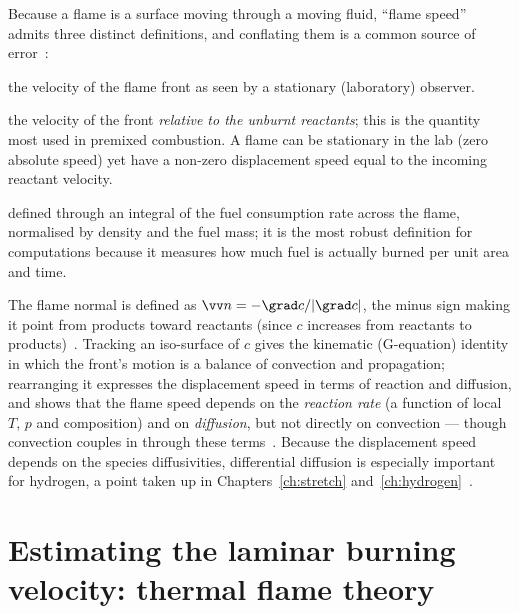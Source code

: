 Because a flame is a surface moving through a moving fluid, ``flame speed'' admits three distinct definitions, and conflating them is a common source of error~\cite{transcript_l9,lecture9}:
\begin{description}[leftmargin=1.5em,itemsep=2pt]
\item[Absolute speed] the velocity of the flame front as seen by a stationary (laboratory) observer.
\item[Displacement speed $s_d$] the velocity of the front \emph{relative to the unburnt reactants}; this is the quantity most used in premixed combustion. A flame can be stationary in the lab (zero absolute speed) yet have a non-zero displacement speed equal to the incoming reactant velocity.
\item[Consumption speed] defined through an integral of the fuel consumption rate across the flame, normalised by density and the fuel mass; it is the most robust definition for computations because it measures how much fuel is actually burned per unit area and time.
\end{description}
The flame normal is defined as $\vv n=-\grad c/|\grad c|$, the minus sign making it point from products toward reactants (since $c$ increases from reactants to products)~\cite{lecture9,transcript_l9}. Tracking an iso-surface of $c$ gives the kinematic (G-equation) identity in which the front's motion is a balance of convection and propagation; rearranging it expresses the displacement speed in terms of reaction and diffusion, and shows that the flame speed depends on the \emph{reaction rate} (a function of local $T$, $p$ and composition) and on \emph{diffusion}, but not directly on convection --- though convection couples in through these terms~\cite{lecture9,transcript_l9}. Because the displacement speed depends on the species diffusivities, differential diffusion is especially important for hydrogen, a point taken up in Chapters~\ref{ch:stretch} and~\ref{ch:hydrogen}~\cite{lecture9}.

\section{Estimating the laminar burning velocity: thermal flame theory}

